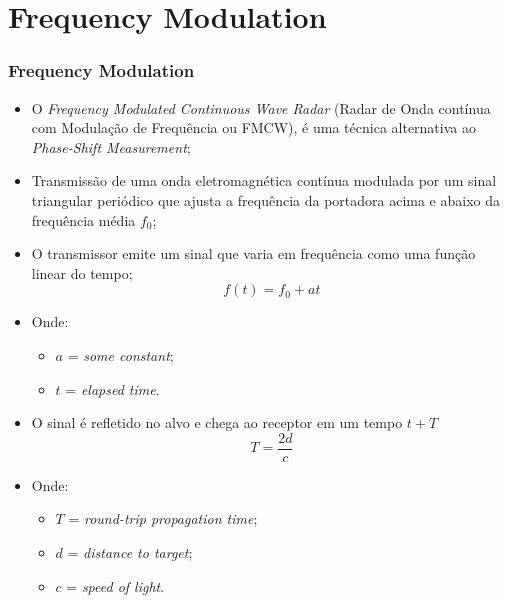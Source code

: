 \documentclass[xcolor=dvipsnames, aspectratio=169]{beamer}
\begin{document}
\section[Introdução]{Frequency Modulation} 
\begin{frame}
\frametitle{Frequency Modulation}
	\begin{itemize}
		\item O \textit{Frequency Modulated Continuous Wave Radar} (Radar de Onda contínua com Modulação de Frequência ou FMCW), é uma técnica alternativa ao \textit{Phase-Shift Measurement};
		\item Transmissão de uma onda eletromagnética contínua modulada por um sinal triangular periódico que ajusta a frequência da portadora acima e abaixo da frequência média $f_{0}$;
		\item O transmissor emite um sinal que varia em frequência como uma função linear do tempo;
		\begin{equation}
            f(t) = f_0 + at
        \end{equation}
        \item Onde:
        \begin{itemize}
            \item[] $a$ = \textit{some constant};
            \item[] $t$ = \textit{elapsed time}.
        \end{itemize}
        \item O sinal é refletido no alvo e chega ao receptor em um tempo $t + T$
        \begin{equation}
            T = \frac{2d}{c}
        \end{equation}
        \item Onde:
        \begin{itemize}
            \item[] $T$ = \textit{round-trip propagation time};
            \item[] $d$ = \textit{distance to target};
            \item[] $c$ = \textit{speed of light}.
        \end{itemize}
        \begin{figure}
            \centering

\end{figure}
\end{itemize}
\end{frame}
\end{document}
